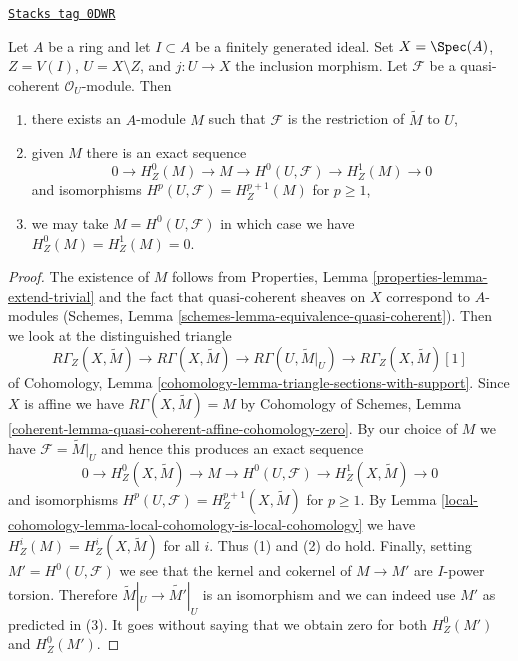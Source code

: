 \begin{lemma}
\label{local-cohomology-lemma-local-cohomology}
\href{https://stacks.math.columbia.edu/tag/0DWR}{\texttt{Stacks tag 0DWR}}

Let $A$ be a ring and let $I \subset A$ be a finitely generated ideal.
Set $X = \Spec(A)$, $Z = V(I)$, $U = X \setminus Z$, and $j : U \to X$
the inclusion morphism. Let $\mathcal{F}$ be a quasi-coherent
$\mathcal{O}_U$-module. Then
\begin{enumerate}
\item there exists an $A$-module $M$ such that $\mathcal{F}$ is the
restriction of $\widetilde{M}$ to $U$,
\item given $M$ there is an exact sequence
$$
0 \to H^0_Z(M) \to M \to H^0(U, \mathcal{F}) \to H^1_Z(M) \to 0
$$
and isomorphisms $H^p(U, \mathcal{F}) = H^{p + 1}_Z(M)$ for $p \geq 1$,
\item we may take $M = H^0(U, \mathcal{F})$ in which case
we have $H^0_Z(M) = H^1_Z(M) = 0$.
\end{enumerate}
\end{lemma}

\begin{proof}
The existence of $M$ follows from
Properties, Lemma \ref{properties-lemma-extend-trivial}
and the fact that quasi-coherent sheaves on $X$ correspond
to $A$-modules (Schemes, Lemma \ref{schemes-lemma-equivalence-quasi-coherent}).
Then we look at the distinguished triangle
$$
R\Gamma_Z(X, \widetilde{M}) \to R\Gamma(X, \widetilde{M}) \to
R\Gamma(U, \widetilde{M}|_U) \to R\Gamma_Z(X, \widetilde{M})[1]
$$
of Cohomology, Lemma \ref{cohomology-lemma-triangle-sections-with-support}.
Since $X$ is affine we have $R\Gamma(X, \widetilde{M}) = M$
by Cohomology of Schemes, Lemma
\ref{coherent-lemma-quasi-coherent-affine-cohomology-zero}.
By our choice of $M$ we have $\mathcal{F} = \widetilde{M}|_U$
and hence this produces an exact sequence
$$
0 \to H^0_Z(X, \widetilde{M}) \to M \to H^0(U, \mathcal{F}) \to
H^1_Z(X, \widetilde{M}) \to 0
$$
and isomorphisms $H^p(U, \mathcal{F}) = H^{p + 1}_Z(X, \widetilde{M})$
for $p \geq 1$. By Lemma \ref{local-cohomology-lemma-local-cohomology-is-local-cohomology}
we have $H^i_Z(M) = H^i_Z(X, \widetilde{M})$ for all $i$.
Thus (1) and (2) do hold.
Finally, setting $M' = H^0(U, \mathcal{F})$ we see that
the kernel and cokernel of $M \to M'$ are $I$-power torsion.
Therefore $\widetilde{M}|_U \to \widetilde{M'}|_U$ is an isomorphism
and we can indeed use $M'$ as predicted in (3). It goes without saying
that we obtain zero for both $H^0_Z(M')$ and $H^0_Z(M')$.
\end{proof}

